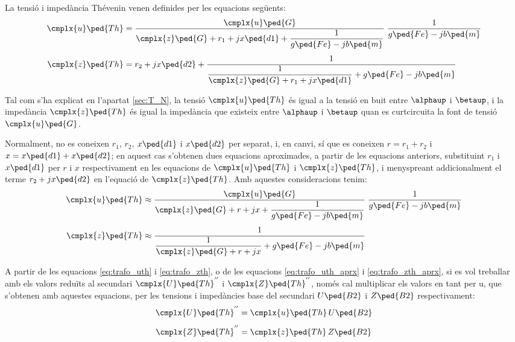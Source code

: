 La tensió i impedància Thévenin venen definides per les equacions
següents:
\begin{align}
    \cmplx{u}\ped{Th} &= \frac{\cmplx{u}\ped{G}}{\cmplx{z}\ped{G} + r_1 + j
    x\ped{d1} + \dfrac{1}{g\ped{Fe}-j b\ped{m}}} \;\frac{1}{g\ped{Fe}-j
    b\ped{m}} \label{eq:trafo_uth}\\[1ex]
    \cmplx{z}\ped{Th} &= r_2 + j x\ped{d2} + \frac{1}{\dfrac{1}{\cmplx{z}\ped{G} + r_1 +
    j x\ped{d1}} + g\ped{Fe}-j b\ped{m}}\label{eq:trafo_zth}
\end{align}

Tal com s'ha explicat en l'apartat \vref{sec:T_N}, la tensió
$\cmplx{u}\ped{Th}$ és igual a la tensió en buit entre $\alphaup$ i
$\betaup$, i la impedància $\cmplx{z}\ped{Th}$ és igual la impedància
que existeix entre $\alphaup$ i $\betaup$ quan es curtcircuita la font
de tensió $\cmplx{u}\ped{G}$.

Normalment, no es coneixen $r_1$, $r_2$, $x\ped{d1}$ i $x\ped{d2}$ per separat, i, en canvi, sí que es coneixen $r=r_1+r_2$ i $x=x\ped{d1}+x\ped{d2}$; en aquest
cas s'obtenen dues equacions aproximades, a partir de les equacions
anteriors, substituint $r_1$ i $x\ped{d1}$ per $r$ i $x$ respectivament en
les equacions de $\cmplx{u}\ped{Th}$ i $\cmplx{z}\ped{Th}$, i
menyspreant addicionalment el terme $r_2 + j x\ped{d2}$ en l'equació
de $\cmplx{z}\ped{Th}$. Amb aquestes consideracions tenim:
\begin{align}
    \cmplx{u}\ped{Th} &\approx \frac{\cmplx{u}\ped{G}}{\cmplx{z}\ped{G} + r + j
    x + \dfrac{1}{g\ped{Fe}-j b\ped{m}}} \;\frac{1}{g\ped{Fe}-j
    b\ped{m}} \label{eq:trafo_uth_aprx}\\[1ex]
    \cmplx{z}\ped{Th} &\approx \frac{1}{\dfrac{1}{\cmplx{z}\ped{G} + r +
    j x} + g\ped{Fe}-j b\ped{m}}\label{eq:trafo_zth_aprx}
\end{align}

A partir de les equacions \eqref{eq:trafo_uth} i
\eqref{eq:trafo_zth}, o de les equacions \eqref{eq:trafo_uth_aprx} i
\eqref{eq:trafo_zth_aprx}, si es vol treballar amb els valors
reduïts al secundari $\cmplx{U}\ped{Th}^{''}$ i
$\cmplx{Z}\ped{Th}^{''}$, només cal multiplicar els valors en tant per u, 
que s'obtenen amb aquestes equacions, per les tensions i impedàncies
base del secundari $U\ped{B2}$ i $Z\ped{B2}$ respectivament:
\begin{align}
    \cmplx{U}\ped{Th}^{''} &= \cmplx{u}\ped{Th} \, U\ped{B2} \\[1ex]
    \cmplx{Z}\ped{Th}^{''} &= \cmplx{z}\ped{Th} \, Z\ped{B2}
\end{align}



